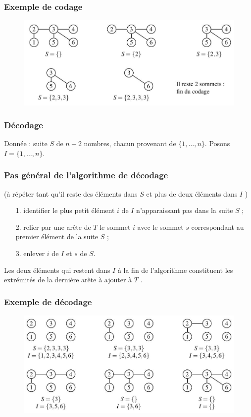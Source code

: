 \subsubsection*{Exemple de codage}
\begin{figure}[h]
\centering
\includegraphics[width=\linewidth]{images/graph14}
\end{figure}

\subsubsection*{Décodage}
Donnée : suite $ S $ de $ n - 2 $ nombres, chacun provenant de $ \{1, \dots , n\} $.
Posons $ I = \{1, \dots , n\} $.
\subsubsection*{Pas général de l'algorithme de décodage}
(à répéter tant qu'il reste des éléments dans $ S $ et plus de deux éléments dans $ I $ )
\begin{itemize}
	\item[1.] identifier le plus petit élément $ i $ de $ I $ n'apparaissant pas dans la suite $ S $ ;
	\item[2.] relier par une arête de $ T $ le sommet $ i $ avec le sommet $ s $ correspondant au premier
élément de la suite $ S $ ;
	\item[3.] enlever $ i $ de $ I $ et $ s $ de $ S $.
\end{itemize}
Les deux éléments qui restent dans $ I $ à la fin de l'algorithme constituent les extrémités de
la dernière arête à ajouter à $ T $ .
\newpage
\subsubsection*{Exemple de décodage}
\begin{figure}[h]
\centering
\includegraphics[width=1\linewidth]{images/graph15}
\end{figure}

